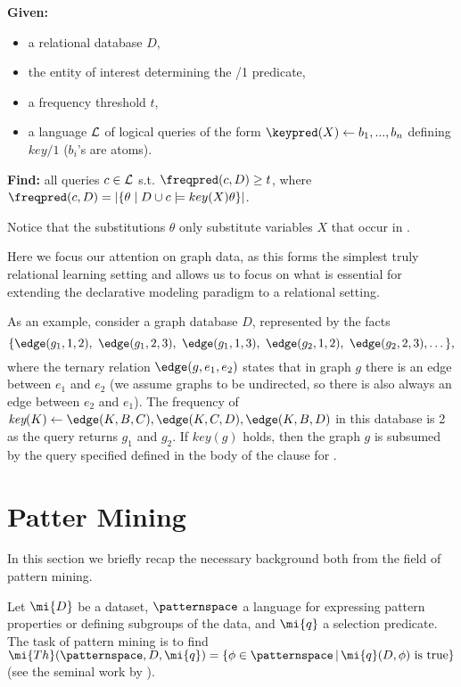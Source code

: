 \noindent
{\bf Given:} \vspace{-8pt}
\begin{itemize}
\item a relational database $D$,
\item the entity of interest determining the \keypred/1 predicate,
\item a frequency threshold $t$,
\item a language ${\cal L}$ of logical queries of the form $\keypred(X) \leftarrow b_1, ..., b_n$ defining $key/1$ ($b_i$'s are atoms).
\end{itemize}\vspace{-5pt}
{\bf Find:} all queries $c \in {\cal L}$ s.t. $\freqpred(c,D) \geq t$, where ${\freqpred(c,D) = |\{\theta \mid D \cup c \models key(X)\theta \}|}$.

Notice that the substitutions $\theta$ only substitute variables $X$ that occur in \keypred. 

Here we focus our attention on graph data, as this forms the simplest truly relational learning setting and allows us to focus on what is essential for extending the declarative modeling paradigm to a relational setting. 
 
As an example, consider a graph database $D$, represented by the facts 
\begin{equation*}
\{ \edge(g_1,1,2),~ \edge(g_1,2,3),~ \edge(g_1,1,3),~ \edge(g_2,1,2),~ \edge(g_2,2,3), \dots \},
\end{equation*}
where the ternary relation $\edge(g,e_1,e_2)$ states that in graph $g$ there is an edge between $e_1$ and $e_2$ (we assume graphs to be undirected, so there is also always an edge between $e_2$ and $e_1$). The frequency of $\textit{key}(K) \leftarrow \edge(K,B,C), \edge(K,C,D), \edge(K,B,D)$ in this database is 2 as the query returns $g_1$ and $g_2$. If $key(g)$ holds,  then the graph $g$ is subsumed by the query specified defined in the body of the clause for \keypred.
\section{Patter Mining}\label{sec:prelim}
In this section we briefly recap the necessary background both from the field of pattern mining.

Let $\mi{D}$ be a dataset, $\patternspace$ a language for expressing pattern properties or defining subgroups of the
data, and $\mi{q}$ a selection predicate. %
The task of pattern mining is to find $\mi{Th}(\patternspace,D, \mi{q})= \{\phi \in \patternspace\, |\, \mi{q}(D, \phi) \text{ is true}\}$ (see the seminal work by \cite{DBLP:journals/datamine/MannilaT97}). 

